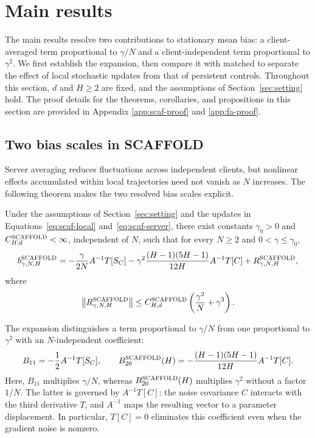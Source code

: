 \section{Main results}
\label{sec:main-results}

The main results resolve two contributions to stationary mean bias: a client-averaged term proportional to $\gamma/N$ and a client-independent term proportional to $\gamma^2$. We first establish the \Scaf{} expansion, then compare it with matched \FedAvg{} to separate the effect of local stochastic updates from that of persistent controls. Throughout this section, $d$ and $H\geq2$ are fixed, and the assumptions of Section~\ref{sec:setting} hold. The proof details for the theorems, corollaries, and propositions in this section are provided in Appendix \ref{app:scaf-proof} and \ref{app:fa-proof}.

\subsection{Two bias scales in SCAFFOLD}

Server averaging reduces fluctuations across independent clients, but nonlinear effects accumulated within local trajectories need not vanish as $N$ increases. The following theorem makes the two resolved bias scales explicit.

\begin{theorem}
\label{thm:scaf-main}
Under the assumptions of Section~\ref{sec:setting} and the \Scaf{} updates in Equations~\eqref{eq:scaf-local} and~\eqref{eq:scaf-server}, there exist constants $\gamma_0>0$ and $C^{\textnormal{\textsc{SCAFFOLD}}}_{H,d}<\infty$, independent of $N$, such that for every $N\geq2$ and $0<\gamma\leq\gamma_0$,
\begin{equation}
\label{eq:scaf-main-expansion}
b^{\textnormal{\textsc{SCAFFOLD}}}_{\gamma,N,H}
=-\frac{\gamma}{2N}A^{-1}T[S_C]
-\gamma^2\frac{(H-1)(5H-1)}{12H}A^{-1}T[C]
+R^{\textnormal{\textsc{SCAFFOLD}}}_{\gamma,N,H},
\end{equation}
where
\begin{equation}
\label{eq:scaf-main-rem}
\bigl\|R^{\textnormal{\textsc{SCAFFOLD}}}_{\gamma,N,H}\bigr\|
\leq C^{\textnormal{\textsc{SCAFFOLD}}}_{H,d}\left(\frac{\gamma^2}{N}+\gamma^3\right).
\end{equation}
\end{theorem}

The expansion distinguishes a term proportional to $\gamma/N$ from one proportional to $\gamma^2$ with an $N$-independent coefficient:
\begin{equation}
\label{eq:scaf-B}
B_{11}=-\frac12A^{-1}T[S_C],\qquad
B_{20}^{\textnormal{\textsc{SCAFFOLD}}}(H)
=-\frac{(H-1)(5H-1)}{12H}A^{-1}T[C].
\end{equation}
Here, $B_{11}$ multiplies $\gamma/N$, whereas $B_{20}^{\textnormal{\textsc{SCAFFOLD}}}(H)$ multiplies $\gamma^2$ without a factor $1/N$. The latter is governed by $A^{-1}T[C]$: the noise covariance $C$ interacts with the third derivative $T$, and $A^{-1}$ maps the resulting vector to a parameter displacement. In particular, $T[C]=0$ eliminates this coefficient even when the gradient noise is nonzero.


